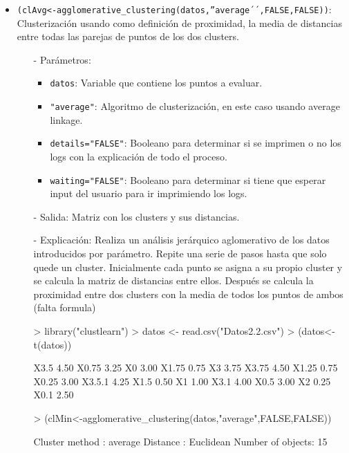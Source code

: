 \documentclass[a4paper, 12pt]{article}
\begin{document}
\begin{itemize}
		\item \texttt{(clAvg<-agglomerative\_clustering(datos,''average´´,FALSE,FALSE))}: Clusterización usando como definición de proximidad, la media de distancias entre todas las parejas de puntos de los dos clusters.
		\begin{itemize}
			\item [-] Parámetros:
			\begin{itemize}
				\item \texttt{datos}: Variable que contiene los puntos a evaluar.
				\item \texttt{"average"}: Algoritmo de clusterización, en este caso usando average linkage.
				\item \texttt{details="FALSE"}: Booleano para determinar si se imprimen o no los logs con la explicación de todo el proceso.
				\item \texttt{waiting="FALSE"}: Booleano para determinar si tiene que esperar input del usuario para ir imprimiendo los logs.
			\end{itemize}
			\item [-] Salida: Matriz con los clusters y sus distancias.
			\item [-] Explicación: Realiza un análisis jerárquico aglomerativo de los datos introducidos por parámetro. Repite una serie de pasos hasta que solo quede un cluster. Inicialmente cada punto se asigna a su propio cluster y se calcula la matriz de distancias entre ellos. Después se calcula la proximidad entre dos clusters con la media de todos los puntos de ambos (falta formula)
\begin{Schunk}
\begin{Sinput}
> library("clustlearn")
> datos <- read.csv("Datos2.2.csv")
> (datos<-t(datos))
\end{Sinput}
\begin{Soutput}
       [,1]
X3.5   4.50
X0.75  3.25
X0     3.00
X1.75  0.75
X3     3.75
X3.75  4.50
X1.25  0.75
X0.25  3.00
X3.5.1 4.25
X1.5   0.50
X1     1.00
X3.1   4.00
X0.5   3.00
X2     0.25
X0.1   2.50
\end{Soutput}
\begin{Sinput}
> (clMin<-agglomerative_clustering(datos,"average",FALSE,FALSE))
\end{Sinput}
\begin{Soutput}
Cluster method   : average 
Distance         : Euclidean 
Number of objects: 15 
\end{Soutput}
\end{Schunk}
		\end{itemize}
	\end{itemize}
	
\end{document}
